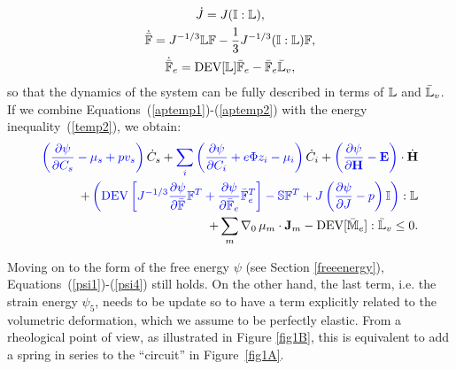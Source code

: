 \begin{gather}
\dot{J} = J (\mathbb{I}:\mathbb{L}),\\
\dot{\bar{\mathbb{F}}} = J^{-1/3} \mathbb{L} \mathbb{F} - \frac{1}{3} J^{-1/3} (\mathbb{I}:\mathbb{L}) \mathbb{F}, \\
\dot{\bar{\mathbb{F}}}_e = \text{DEV}[\mathbb{L}] \bar{\mathbb{F}}_e -\bar{\mathbb{F}}_e \bar{\mathbb{L}}_v,\label{aptemp2}
\end{gather}
so that the dynamics of the system can be fully described in terms of $\mathbb{L}$ and $\bar{\mathbb{L}}_v$. If we combine Equations~(\ref{aptemp1})-(\ref{aptemp2}) with the energy inequality~(\ref{temp2}), we obtain:
\begin{equation}
\begin{aligned}
\color{blue} \left(\frac{\partial \psi}{\partial C_s}-\mu_s+p v_s\right)\color{black}\dot{C}_s+ \color{blue}\sum_i\left(\frac{\partial \psi}{\partial C_i} + e\Phi z_i-\mu_i\right)\color{black} \dot{C}_i
+\color{blue}\left(\frac{\partial \psi}{\partial \mathbf{H}}-\mathbf{E}\right) \color{black} \cdot \dot{\mathbf{H}}\\
+\color{blue} \left(\text{DEV}\left[J^{-1/3}\frac{\partial \psi}{\partial \bar{\mathbb{F}}}\mathbb{F}^T + \frac{\partial \psi}{\partial \bar{\mathbb{F}}_e}\bar{\mathbb{F}}_e^{T}\right]- \mathbb{S}\mathbb{F}^T +J\left(\frac{\partial \psi}{\partial J} - p\right)\mathbb{I}\right)\color{black}:\mathbb{L}\\
+ \sum_m \nabla_0 \,\mu_m \cdot \mathbf{J}_m - \text{DEV}[\mathbb{\bar{M}}_e]:\mathbb{\bar{L}}_v\leq 0 . \label{ineq2}
\end{aligned}
\end{equation}

Moving on to the form of the free energy $\psi$ (see Section \ref{freeenergy}), Equations~(\ref{psi1})-(\ref{psi4}) still holds. On the other hand, the last term, i.e. the strain energy $\psi_5$, needs to be update so to have a term explicitly related to the volumetric deformation, which we assume to be perfectly elastic. From a rheological point of view, as illustrated in Figure \ref{fig1B}, this is equivalent to add a spring in series to the \textquotedblleft circuit'' in Figure~\ref{fig1A}.

